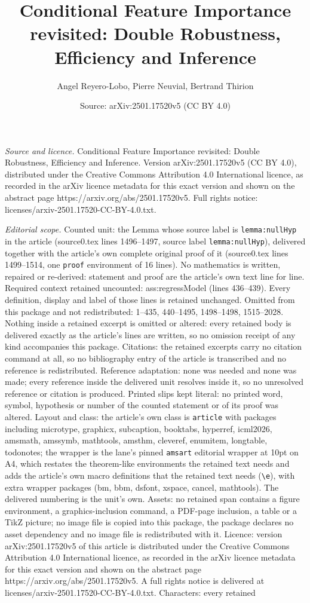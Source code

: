 \documentclass[10pt,a4paper]{amsart}
\title[Conditional Feature Importance revisited: Double Robustness,]{Conditional Feature Importance revisited: Double Robustness, Efficiency and Inference}
\author{Angel Reyero-Lobo, Pierre Neuvial, Bertrand Thirion}
\date{Source: arXiv:2501.17520v5 (CC BY 4.0)}
\begin{document}
\maketitle

\noindent\emph{Source and licence.} Conditional Feature Importance revisited: Double Robustness, Efficiency and Inference. Version arXiv:2501.17520v5 (CC BY 4.0), distributed under the Creative Commons Attribution 4.0 International licence, as recorded in the arXiv licence metadata for this exact version and shown on the abstract page https://arxiv.org/abs/2501.17520v5. Full rights notice: licenses/arxiv-2501.17520-CC-BY-4.0.txt.\par\smallskip

\noindent\textit{Editorial scope.} Counted unit: the Lemma whose source label is \texttt{lemma:nullHyp} in the article (source0.tex lines 1496--1497, source label \texttt{lemma:nullHyp}), delivered together with the article's own complete original proof of it (source0.tex lines 1499--1514, one \texttt{proof} environment of 16 lines). No mathematics is written, repaired or re-derived: statement and proof are the article's own text line for line. Required context retained uncounted: ass:regressModel (lines 436--439). Every definition, display and label of those lines is retained unchanged. Omitted from this package and not redistributed: 1--435, 440--1495, 1498--1498, 1515--2028. Nothing inside a retained excerpt is omitted or altered: every retained body is delivered exactly as the article's lines are written, so no omission receipt of any kind accompanies this package. Citations: the retained excerpts carry no citation command at all, so no bibliography entry of the article is transcribed and no reference is redistributed. Reference adaptation: none was needed and none was made; every reference inside the delivered unit resolves inside it, so no unresolved reference or citation is produced. Printed slips kept literal: no printed word, symbol, hypothesis or number of the counted statement or of its proof was altered. Layout and class: the article's own class is \texttt{article} with packages including microtype, graphicx, subcaption, booktabs, hyperref, icml2026, amsmath, amssymb, mathtools, amsthm, cleveref, enumitem, longtable, todonotes; the wrapper is the lane's pinned \texttt{amsart} editorial wrapper at 10pt on A4, which restates the theorem-like environments the retained text needs and adds the article's own macro definitions that the retained text needs (\texttt{\textbackslash e}), with extra wrapper packages (bm, bbm, dsfont, xspace, cancel, mathtools). The delivered numbering is the unit's own. Assets: no retained span contains a figure environment, a graphics-inclusion command, a PDF-page inclusion, a table or a TikZ picture; no image file is copied into this package, the package declares no asset dependency and no image file is redistributed with it. Licence: version arXiv:2501.17520v5 of this article is distributed under the Creative Commons Attribution 4.0 International licence, as recorded in the arXiv licence metadata for this exact version and shown on the abstract page https://arxiv.org/abs/2501.17520v5. A full rights notice is delivered at licenses/arxiv-2501.17520-CC-BY-4.0.txt. Characters: every retained 
\end{document}
